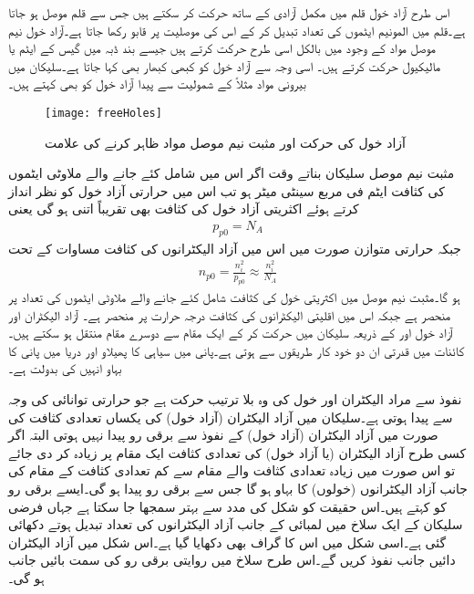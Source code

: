 اس طرح آزاد خول قلم میں مکمل آزادی کے ساتھ حرکت کر سکتے ہیں جس سے قلم موصل ہو جاتا ہے۔قلم میں المونیم ایٹموں کی تعداد تبدیل کر کے اس کی موصلیت پر قابو رکھا جاتا ہے۔آزاد خول  نیم موصل مواد کے وجود میں بالکل اسی طرح حرکت کرتے ہیں جیسے بند ڈبہ میں گیس کے ایٹم یا مالیکیول حرکت کرتے ہیں۔ اسی وجہ سے آزاد خول کو کبھی کبھار    بھی کہا جاتا ہے۔سلیکان میں بیرونی مواد مثلاً  کے شمولیت سے پیدا آزاد خول کو   بھی کہتے ہیں۔
\begin{figure}
\centering
\texttt{[image: freeHoles]}
\caption{ آزاد خول کی حرکت اور مثبت نیم موصل مواد ظاہر کرنے کی علامت}
\label{شکل_آزاد_خول}
\end{figure}
مثبت نیم موصل سلیکان بناتے وقت اگر اس میں شامل کئے جانے والے ملاوٹی ایٹموں کی کثافت  ایٹم فی مربع سینٹی میٹر ہو تب اس میں حرارتی آزاد خول کو نظر انداز کرتے ہوئے اکثریتی آزاد خول کی کثافت  بھی تقریباً اتنی ہو گی یعنی
\begin{align}
p_{p0}=N_A
\end{align}
جبکہ حرارتی متوازن صورت میں اس میں آزاد الیکٹرانوں کی کثافت مساوات   کے تحت
\begin{align}
n_{p0}=\frac{n_i^2}{p_{p0}} \approx \frac{n_i^2}{N_A}
\end{align}
ہو گا۔مثبت نیم موصل میں اکثریتی خول کی کثافت شامل کئے جانے والے ملاوٹی  ایٹموں کی تعداد پر منحصر ہے جبکہ اس میں اقلیتی الیکٹرانوں کی کثافت درجہ حرارت پر منحصر ہے۔
 آزاد الیکٹران اور آزاد خول   اور   کے ذریعہ سلیکان میں حرکت کر کے ایک مقام سے دوسرے مقام منتقل ہو سکتے ہیں۔کائنات میں قدرتی   ان دو خود کار طریقوں سے ہوتی ہے۔پانی میں سیاہی کا پھیلاو اور دریا میں پانی کا بہاو انہیں کی بدولت ہے۔

نفوذ سے مراد الیکٹران اور خول کی وہ بلا ترتیب حرکت ہے جو حرارتی توانائی کی وجہ سے پیدا ہوتی ہے۔سلیکان میں آزاد الیکٹران (آزاد خول) کی یکساں تعدادی کثافت کی صورت میں آزاد الیکٹران (آزاد خول)  کے نفوذ سے برقی رو پیدا نہیں ہوتی البتہ اگر کسی طرح آزاد الیکٹران (یا آزاد خول) کی تعدادی کثافت ایک مقام پر زیادہ کر دی جائے تو اس صورت میں زیادہ تعدادی کثافت والے مقام سے کم تعدادی کثافت کے مقام کی جانب آزاد الیکٹرانوں (خولوں) کا بہاو ہو گا جس سے برقی رو پیدا ہو گی۔ایسے برقی رو کو   کہتے ہیں۔اس حقیقت کو شکل   کی مدد سے بہتر سمجھا جا سکتا ہے جہاں فرضی سلیکان کے ایک سلاخ میں لمبائی کے جانب آزاد الیکٹرانوں کی تعداد تبدیل ہوتے دکھائی گئی ہے۔اسی شکل میں اس کا گراف بھی دکھایا گیا ہے۔اس شکل میں آزاد الیکٹران دائیں جانب نفوذ کریں گے۔اس طرح سلاخ میں روایتی برقی رو کی سمت بائیں جانب ہو گی۔

